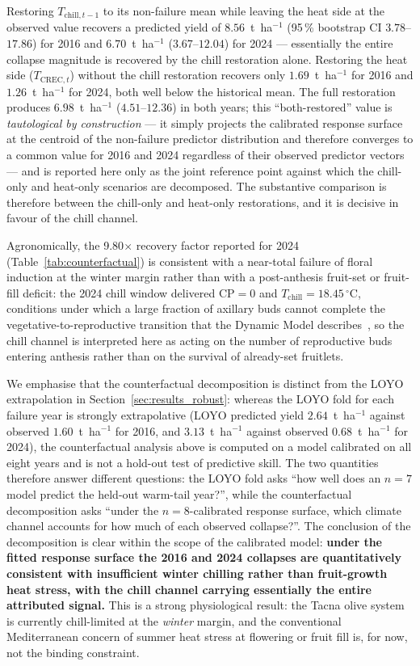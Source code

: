 \documentclass[agronomy,article,submit,pdftex,moreauthors]{Definitions/mdpi}
\begin{document}
Restoring $T_{\text{chill},t-1}$ to its non-failure mean while leaving the heat side at the observed value recovers a predicted yield of $8.56$~t~ha$^{-1}$ (95\,\% bootstrap CI $3.78$--$17.86$) for 2016 and $6.70$~t~ha$^{-1}$ ($3.67$--$12.04$) for 2024 --- essentially the entire collapse magnitude is recovered by the chill restoration alone. Restoring the heat side ($T_{\text{CREC},t}$) without the chill restoration recovers only $1.69$~t~ha$^{-1}$ for 2016 and $1.26$~t~ha$^{-1}$ for 2024, both well below the historical mean. The full restoration produces $6.98$~t~ha$^{-1}$ ($4.51$--$12.36$) in both years; this ``both-restored'' value is \emph{tautological by construction} --- it simply projects the calibrated response surface at the centroid of the non-failure predictor distribution and therefore converges to a common value for 2016 and 2024 regardless of their observed predictor vectors --- and is reported here only as the joint reference point against which the chill-only and heat-only scenarios are decomposed. The substantive comparison is therefore between the chill-only and heat-only restorations, and it is decisive in favour of the chill channel.

Agronomically, the 9.80$\times$ recovery factor reported for 2024 (Table~\ref{tab:counterfactual}) is consistent with a near-total failure of floral induction at the winter margin rather than with a post-anthesis fruit-set or fruit-fill deficit: the 2024 chill window delivered CP$=0$ and $T_{\text{chill}}=18.45\,^\circ$C, conditions under which a large fraction of axillary buds cannot complete the vegetative-to-reproductive transition that the Dynamic Model describes~\cite{deMeloAbreu2004,rallo2013,benlloch2018}, so the chill channel is interpreted here as acting on the number of reproductive buds entering anthesis rather than on the survival of already-set fruitlets.

We emphasise that the counterfactual decomposition is distinct from the LOYO extrapolation in Section~\ref{sec:results_robust}: whereas the LOYO fold for each failure year is strongly extrapolative (LOYO predicted yield $2.64$~t~ha$^{-1}$ against observed $1.60$~t~ha$^{-1}$ for 2016, and $3.13$~t~ha$^{-1}$ against observed $0.68$~t~ha$^{-1}$ for 2024), the counterfactual analysis above is computed on a model calibrated on all eight years and is not a hold-out test of predictive skill. The two quantities therefore answer different questions: the LOYO fold asks ``how well does an $n{=}7$ model predict the held-out warm-tail year?'', while the counterfactual decomposition asks ``under the $n{=}8$-calibrated response surface, which climate channel accounts for how much of each observed collapse?''. The conclusion of the decomposition is clear within the scope of the calibrated model: \textbf{under the fitted response surface the 2016 and 2024 collapses are quantitatively consistent with insufficient winter chilling rather than fruit-growth heat stress, with the chill channel carrying essentially the entire attributed signal.} This is a strong physiological result: the Tacna olive system is currently chill-limited at the \emph{winter} margin, and the conventional Mediterranean concern of summer heat stress at flowering or fruit fill is, for now, not the binding constraint.
\end{document}
